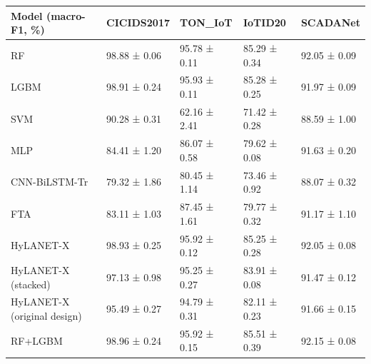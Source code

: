 \begin{tabular}{lllll}
\toprule
Model (macro-F1, \%) & CICIDS2017 & TON\_IoT & IoTID20 & SCADANet \\
\midrule
RF & 98.88 ± 0.06 & 95.78 ± 0.11 & 85.29 ± 0.34 & 92.05 ± 0.09 \\
LGBM & 98.91 ± 0.24 & 95.93 ± 0.11 & 85.28 ± 0.25 & 91.97 ± 0.09 \\
SVM & 90.28 ± 0.31 & 62.16 ± 2.41 & 71.42 ± 0.28 & 88.59 ± 1.00 \\
MLP & 84.41 ± 1.20 & 86.07 ± 0.58 & 79.62 ± 0.08 & 91.63 ± 0.20 \\
CNN-BiLSTM-Tr & 79.32 ± 1.86 & 80.45 ± 1.14 & 73.46 ± 0.92 & 88.07 ± 0.32 \\
FTA & 83.11 ± 1.03 & 87.45 ± 1.61 & 79.77 ± 0.32 & 91.17 ± 1.10 \\
HyLANET-X & 98.93 ± 0.25 & 95.92 ± 0.12 & 85.25 ± 0.28 & 92.05 ± 0.08 \\
HyLANET-X (stacked) & 97.13 ± 0.98 & 95.25 ± 0.27 & 83.91 ± 0.08 & 91.47 ± 0.12 \\
HyLANET-X (original design) & 95.49 ± 0.27 & 94.79 ± 0.31 & 82.11 ± 0.23 & 91.66 ± 0.15 \\
RF+LGBM & 98.96 ± 0.24 & 95.92 ± 0.15 & 85.51 ± 0.39 & 92.15 ± 0.08 \\
\bottomrule
\end{tabular}
